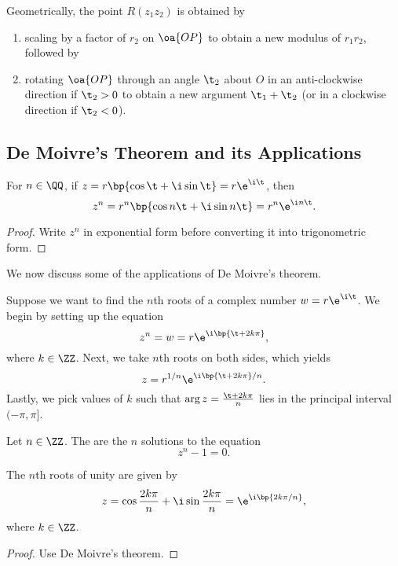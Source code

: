 Geometrically, the point $R(z_1 z_2)$ is obtained by
\begin{enumerate}
    \item scaling by a factor of $r_2$ on $\oa{OP}$ to obtain a new modulus of $r_1 r_2$, followed by
    \item rotating $\oa{OP}$ through an angle $\t_2$ about $O$ in an anti-clockwise direction if $\t_2 > 0$ to obtain a new argument $\t_1 + \t_2$ (or in a clockwise direction if $\t_2 < 0$).
\end{enumerate}

\subsection{De Moivre's Theorem and its Applications}

\begin{theorem}
    For $n \in \QQ$, if $z = r\bp{\cos \t + \i \sin \t} = r \e^{\i \t}$, then \[z^n = r^n \bp{\cos n\t + \i \sin n\t} = r^n \e^{\i n \t}.\]
\end{theorem}
\begin{proof}
    Write $z^n$ in exponential form before converting it into trigonometric form.
\end{proof}

We now discuss some of the applications of De Moivre's theorem.

\begin{method}
    Suppose we want to find the $n$th roots of a complex number $w = r \e^{\i \t}$. We begin by setting up the equation \[z^n = w = r \e^{\i \bp{\t + 2k\pi}},\] where $k \in \ZZ$. Next, we take $n$th roots on both sides, which yields \[z = r^{1/n} \e^{\i \bp{\t + 2k\pi} /n}.\] Lastly, we pick values of $k$ such that $\arg z = \frac{\t + 2k\pi}{n}$ lies in the principal interval $(-\pi, \pi]$.
\end{method}

\begin{definition}
    Let $n \in \ZZ$. The  are the $n$ solutions to the equation \[z^n - 1 = 0.\]
\end{definition}

\begin{proposition}
    The $n$th roots of unity are given by \[z = \cos \frac{2k \pi}{n} + \i \sin \frac{2k \pi}{n} = \e^{\i \bp{2k \pi / n}},\] where $k \in \ZZ$.
\end{proposition}
\begin{proof}
    Use De Moivre's theorem.
\end{proof}

